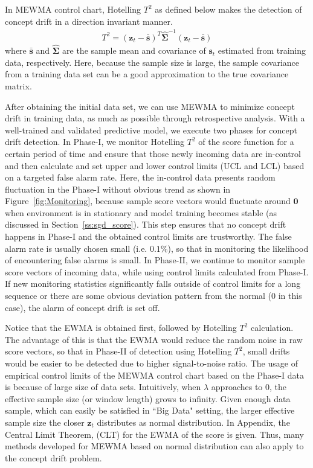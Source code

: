 \documentclass[twoside,11pt]{article}
\begin{document}
In MEWMA control chart, Hotelling $T^2$ as defined below makes the detection of concept drift in a direction invariant manner.
\begin{align}
T^2 = (\bm {z}_t-\bar { \bm {s}})^T \hat {\bm { \Sigma}} ^{-1}(\bm {z}_t-\bar { \bm {s}})
\label{eqn:hotellingt2}
\end{align}
where $\bar {\bm{s}}$ and $\hat {\bm {\Sigma}}$ are the sample mean and covariance of $\bm {s}_t$ estimated from training data, respectively. Here, because the sample size is large, the sample covariance from a training data set can be a good approximation to the true covariance matrix.

After obtaining the initial data set, we can use MEWMA to minimize concept drift in training data, as much as possible through retrospective analysis. With a well-trained and validated predictive model, we execute two phases for concept drift detection. In Phase-I, we {monitor Hotelling $T^2$ of the score function for a certain period of time and ensure that those newly incoming data are in-control and} then calculate and set {upper and lower} control limits {(UCL and LCL)} based on a targeted false alarm rate. Here, the in-control data presents random fluctuation in the Phase-I without obvious trend as shown in Figure~\ref{fig:Monitoring}, because sample score vectors would fluctuate around $\bm {0}$ when environment is in stationary and model training becomes stable (as discussed in Section~\ref{ss:sgd_score}). This step ensures that no concept drift happens in Phase-I and the obtained control limits are trustworthy. The false alarm rate is usually chosen small (i.e. $0.1\%$), so that in monitoring the likelihood of encountering false alarms is small. In Phase-II, we continue to monitor sample score vectors of incoming data, while using control limits calculated from Phase-I. If new {monitoring statistics} significantly falls outside of control limits for a long sequence or there are some obvious deviation pattern from the normal ($0$ in this case), the alarm of concept drift is set off.

Notice that the EWMA is obtained first, followed by Hotelling $T^2$ calculation. The advantage of this is that the EWMA would reduce the random noise in raw score vectors, so that in Phase-II of detection using Hotelling $T^2$, small drifts would be easier to be detected due to higher signal-to-noise ratio. The usage of empirical control limits of the MEWMA control chart based on the Phase-I data is because of large size of data sets. Intuitively, when $ \lambda$ approaches to $0$, the effective sample size (or window length) grows to infinity. Given enough data sample, which can easily be satisfied in ``Big Data" setting, the larger effective sample size the closer $\bm {z}_t$ distributes as normal distribution. In Appendix, the Central Limit Theorem, (CLT) for the EWMA of the score is given. Thus, many methods developed for MEWMA based on normal distribution can also apply to the concept drift problem.
\end{document}
